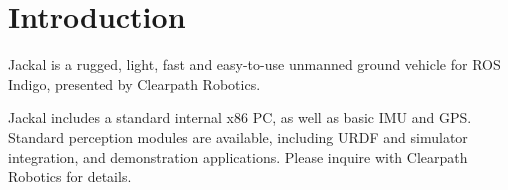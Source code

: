 \documentclass[]{article}
\begin{document}
\thispagestyle{empty}

\tableofcontents

\section{Introduction}

Jackal is a rugged, light, fast and easy-to-use unmanned ground vehicle for ROS Indigo, presented
by Clearpath Robotics.

Jackal includes a standard internal x86 PC, as well as basic IMU and GPS. Standard perception
modules are available, including URDF and simulator integration, and demonstration applications.
Please inquire with Clearpath Robotics for details.
\end{document}
